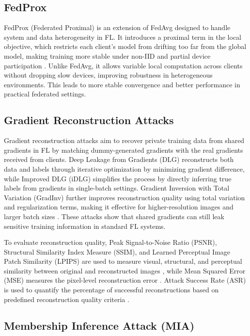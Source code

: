 \documentclass[a4paper,fleqn]{cas-dc}
\begin{document}
\subsection{FedProx}

FedProx (Federated Proximal) is an extension of FedAvg designed to handle system and data heterogeneity in FL. It introduces a proximal term in the local objective, which restricts each client's model from drifting too far from the global model, making training more stable under non-IID and partial device participation \citep{li2020federated}. Unlike FedAvg, it allows variable local computation across clients without dropping slow devices, improving robustness in heterogeneous environments. This leads to more stable convergence and better performance in practical federated settings.

\subsection{Gradient Reconstruction Attacks}

Gradient reconstruction attacks aim to recover private training data from shared gradients in FL by matching dummy-generated gradients with the real gradients received from clients. Deep Leakage from Gradients (DLG) reconstructs both data and labels through iterative optimization by minimizing gradient difference, while Improved DLG (iDLG) simplifies the process by directly inferring true labels from gradients in single-batch settings. Gradient Inversion with Total Variation (GradInv) further improves reconstruction quality using total variation and regularization terms, making it effective for higher-resolution images and larger batch sizes \citep{zhang2022survey}. These attacks show that shared gradients can still leak sensitive training information in standard FL systems.

To evaluate reconstruction quality, Peak Signal-to-Noise Ratio (PSNR), Structural Similarity Index Measure (SSIM), and Learned Perceptual Image Patch Similarity (LPIPS) are used to measure visual, structural, and perceptual similarity between original and reconstructed images \citep{carletti2026guide}, while Mean Squared Error (MSE) measures the pixel-level reconstruction error \citep{shi2024dealing}. Attack Success Rate (ASR) is used to quantify the percentage of successful reconstructions based on predefined reconstruction quality criteria \citep{he2025crafting}.

\subsection{Membership Inference Attack (MIA)}
\end{document}
